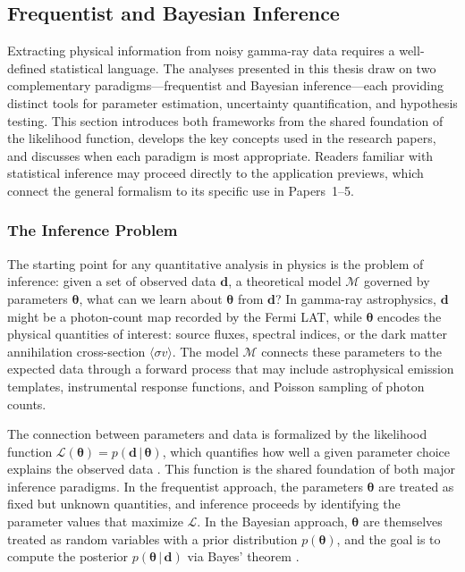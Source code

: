\subsection{Frequentist and Bayesian Inference}
\label{sec:3.1}

Extracting physical information from noisy gamma-ray data requires a well-defined statistical language. The analyses presented in this thesis draw on two complementary paradigms---frequentist and Bayesian inference---each providing distinct tools for parameter estimation, uncertainty quantification, and hypothesis testing. This section introduces both frameworks from the shared foundation of the likelihood function, develops the key concepts used in the research papers, and discusses when each paradigm is most appropriate. Readers familiar with statistical inference may proceed directly to the application previews, which connect the general formalism to its specific use in Papers~1--5.


\subsubsection{The Inference Problem}
\label{sec:3.1.1}

The starting point for any quantitative analysis in physics is the problem of inference: given a set of observed data $\mathbf{d}$, a theoretical model $\mathcal{M}$ governed by parameters $\boldsymbol{\theta}$, what can we learn about $\boldsymbol{\theta}$ from $\mathbf{d}$? In gamma-ray astrophysics, $\mathbf{d}$ might be a photon-count map recorded by the Fermi LAT, while $\boldsymbol{\theta}$ encodes the physical quantities of interest: source fluxes, spectral indices, or the dark matter annihilation cross-section $\langle \sigma v \rangle$. The model $\mathcal{M}$ connects these parameters to the expected data through a forward process that may include astrophysical emission templates, instrumental response functions, and Poisson sampling of photon counts.

The connection between parameters and data is formalized by the likelihood function $\mathcal{L}(\boldsymbol{\theta}) = p(\mathbf{d} \,|\, \boldsymbol{\theta})$, which quantifies how well a given parameter choice explains the observed data \cite{Cranmer:2020}. This function is the shared foundation of both major inference paradigms. In the frequentist approach, the parameters $\boldsymbol{\theta}$ are treated as fixed but unknown quantities, and inference proceeds by identifying the parameter values that maximize $\mathcal{L}$. In the Bayesian approach, $\boldsymbol{\theta}$ are themselves treated as random variables with a prior distribution $p(\boldsymbol{\theta})$, and the goal is to compute the posterior $p(\boldsymbol{\theta} \,|\, \mathbf{d})$ via Bayes' theorem \cite{Bishop:2006, Hastie:2009}.

